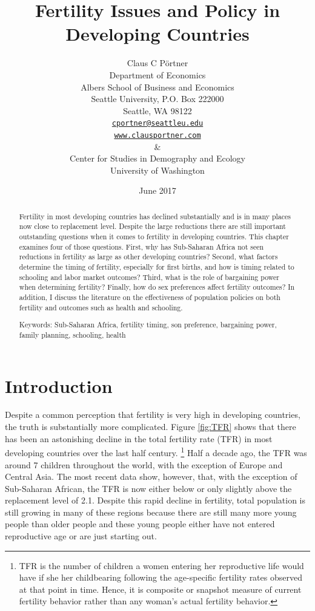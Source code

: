\documentclass[letterpaper,12pt]{article}
\title{Fertility Issues and Policy in Developing Countries}
\author{Claus C P\"ortner\\
    Department of Economics\\
    Albers School of Business and Economics\\
    Seattle University, P.O. Box 222000\\
    Seattle, WA 98122\\
    \href{mailto:cportner@seattleu.edu}{\texttt{cportner@seattleu.edu}}\\
    \href{http://www.clausportner.com}{\texttt{www.clausportner.com}}\\
    \& \\
    Center for Studies in Demography and Ecology \\
    University of Washington\\ \vspace{2cm}
    }
\date{June 2017}
\begin{document}
\maketitle
\thispagestyle{empty}

\begin{abstract}

Fertility in most developing countries has declined substantially 
and is in many places now close to replacement level.
Despite the large reductions there are still important outstanding 
questions when it comes to fertility in developing countries.
This chapter examines four of those questions.
First, why has Sub-Saharan Africa not seen reductions in 
fertility as large as other developing countries?
Second, what factors determine the timing of fertility, especially
for first births, and how is timing related to schooling and labor
market outcomes?
Third, what is the role of bargaining power when determining
fertility?
Finally, how do sex preferences affect fertility outcomes?
In addition, I discuss the literature on the effectiveness 
of population policies on both fertility and outcomes such
as health and schooling.

\noindent Keywords: Sub-Saharan Africa, fertility timing, son preference, 
bargaining power, family planning, schooling, health

\end{abstract}

\newpage 

\doublespacing

\section{Introduction}

Despite a common perception that fertility is very high in developing
countries, the truth is substantially more complicated. 
Figure \ref{fig:TFR} shows that there has been an astonishing decline in
the total fertility rate (TFR) in most developing countries over the
last half century.%
\footnote{
TFR is the number of children a women entering her reproductive life
would have if she her childbearing following the age-specific fertility
rates observed at that point in time. 
Hence, it is composite or snapshot measure of current fertility behavior
rather than any woman's actual fertility behavior.} 
Half a decade ago, the TFR was around 7 children throughout the world,
with the exception of Europe and Central Asia. 
The most recent data show, however, that, with the exception of
Sub-Saharan African, the TFR is now either below or only slightly above
the replacement level of 2.1. 
Despite this rapid decline in fertility, total population is still
growing in many of these regions because there are still many more young
people than older people and these young people either have not entered
reproductive age or are just starting out.
\end{document}
